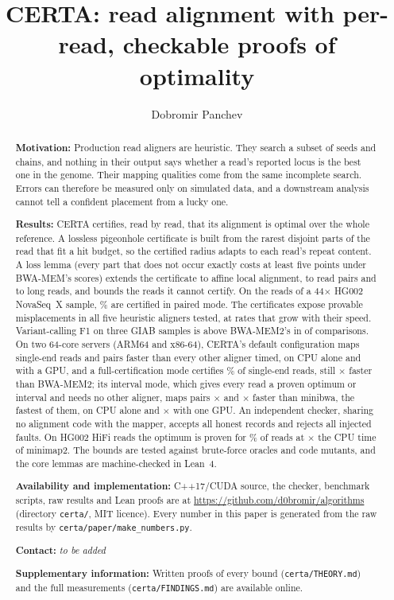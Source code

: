 \documentclass[11pt]{article}
\title{CERTA: read alignment with per-read, checkable proofs of optimality}
\author{Dobromir Panchev}
\affil{\textit{Affiliation to be added}}
\date{}
\theoremstyle{definition}
\begin{document}
\maketitle

\begin{abstract}
\noindent\textbf{Motivation:} Production read aligners are heuristic. They
search a subset of seeds and chains, and nothing in their output says
whether a read's reported locus is the best one in the genome. Their
mapping qualities come from the same incomplete search. Errors can
therefore be measured only on simulated data, and a downstream analysis
cannot tell a confident placement from a lucky one.

\noindent\textbf{Results:} CERTA certifies, read by read, that its
alignment is optimal over the whole reference. A lossless pigeonhole
certificate is built from the rarest disjoint parts of the read that fit a
hit budget, so the certified radius adapts to each read's repeat content.
A loss lemma (every part that does not occur exactly costs at least five
points under BWA-MEM's scores) extends the certificate to affine local
alignment, to read pairs and to long reads, and bounds the reads it cannot
certify. On the \PeReads{} reads of a 44$\times$ HG002 NovaSeq~X sample,
\PeCert\% are certified in paired mode. The certificates expose provable
misplacements in all five heuristic aligners tested, at rates that grow
with their speed. Variant-calling F1 on three GIAB samples is above
BWA-MEM2's in \PeVWins{} of \PeVComparisons{} comparisons. On two 64-core
servers (ARM64 and x86-64), CERTA's default configuration maps single-end
reads and pairs faster than every other aligner timed, on CPU alone and
with a GPU, and a full-certification mode certifies \FCCertSFc\% of
single-end reads, still \FCGSFcCpuXBwa$\times$ faster than BWA-MEM2; its interval
mode, which gives every read a proven optimum or interval and needs no
other aligner, maps pairs \FGPCpuIvXMini$\times$ and \FAPCpuIvXMini$\times$
faster than minibwa, the fastest of them, on CPU alone and
\FGPGpuIvXMini$\times$ with one GPU. An independent checker, sharing no alignment
code with the mapper, accepts all \CkRecords{} honest records and rejects
all \CkFaults{} injected faults. On HG002 HiFi reads the optimum is proven
for \LrExactAll\% of reads at \LrCpuRatio$\times$ the CPU time of minimap2.
The bounds are tested against brute-force oracles and \MutTotal{} code
mutants, and the core lemmas are machine-checked in Lean~4.

\noindent\textbf{Availability and implementation:} C++17/CUDA source, the
checker, benchmark scripts, raw results and Lean proofs are at
\url{https://github.com/d0bromir/algorithms} (directory \texttt{certa/},
MIT licence). Every number in this paper is generated from the raw results
by \nolinkurl{certa/paper/make_numbers.py}.

\noindent\textbf{Contact:} \textit{to be added}

\noindent\textbf{Supplementary information:} Written proofs of every bound
(\texttt{certa/THEORY.md}) and the full measurements
(\texttt{certa/FINDINGS.md}) are available online.
\end{abstract}
\end{document}
